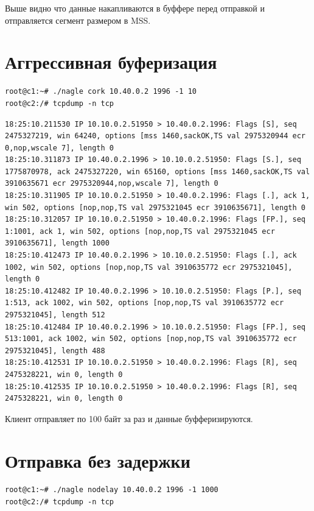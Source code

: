 \documentclass[a4paper,12pt]{article}
\begin{document}
Выше видно что данные накапливаются в буффере перед отправкой и отправляется сегмент размером в MSS.

\section{Аггрессивная буферизация}

\begin{Verbatim}
root@c1:~# ./nagle cork 10.40.0.2 1996 -1 10
root@c2:/# tcpdump -n tcp
\end{Verbatim}

\begin{Verbatim}
18:25:10.211530 IP 10.10.0.2.51950 > 10.40.0.2.1996: Flags [S], seq 2475327219, win 64240, options [mss 1460,sackOK,TS val 2975320944 ecr 0,nop,wscale 7], length 0
18:25:10.311873 IP 10.40.0.2.1996 > 10.10.0.2.51950: Flags [S.], seq 1775870978, ack 2475327220, win 65160, options [mss 1460,sackOK,TS val 3910635671 ecr 2975320944,nop,wscale 7], length 0
18:25:10.311905 IP 10.10.0.2.51950 > 10.40.0.2.1996: Flags [.], ack 1, win 502, options [nop,nop,TS val 2975321045 ecr 3910635671], length 0
18:25:10.312057 IP 10.10.0.2.51950 > 10.40.0.2.1996: Flags [FP.], seq 1:1001, ack 1, win 502, options [nop,nop,TS val 2975321045 ecr 3910635671], length 1000
18:25:10.412473 IP 10.40.0.2.1996 > 10.10.0.2.51950: Flags [.], ack 1002, win 502, options [nop,nop,TS val 3910635772 ecr 2975321045], length 0
18:25:10.412482 IP 10.40.0.2.1996 > 10.10.0.2.51950: Flags [P.], seq 1:513, ack 1002, win 502, options [nop,nop,TS val 3910635772 ecr 2975321045], length 512
18:25:10.412484 IP 10.40.0.2.1996 > 10.10.0.2.51950: Flags [FP.], seq 513:1001, ack 1002, win 502, options [nop,nop,TS val 3910635772 ecr 2975321045], length 488
18:25:10.412531 IP 10.10.0.2.51950 > 10.40.0.2.1996: Flags [R], seq 2475328221, win 0, length 0
18:25:10.412535 IP 10.10.0.2.51950 > 10.40.0.2.1996: Flags [R], seq 2475328221, win 0, length 0
\end{Verbatim}

Клиент отправляет по 100 байт за раз и данные буфферизируются.

\section{Отправка без задержки}

\begin{Verbatim}
root@c1:~# ./nagle nodelay 10.40.0.2 1996 -1 1000
root@c2:/# tcpdump -n tcp
\end{Verbatim}
\end{document}
